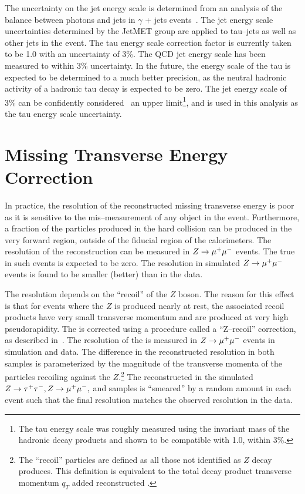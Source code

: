 The uncertainty on the jet energy scale is determined from an analysis of the
\pt balance between photons and jets in $\gamma$ + jets
events~\cite{CMS-PAS-JME-10-010}.  The jet energy scale uncertainties determined
by the JetMET group are applied to tau--jets as well as other jets in the event.
The tau energy scale correction factor is currently taken to be 1.0 with an
uncertainty of 3\%.  The QCD jet energy scale has been measured to within 3\%
uncertainty.  In the future, the energy scale of the tau is expected to be
determined to a much better precision, as the neutral hadronic activity of a
hadronic tau decay is expected to be zero. The jet energy scale of 3\% can be
confidently considered~\cite{CMS-PAS-TAU-11-001} an upper limit\footnote{The tau
energy scale was roughly measured using the invariant mass of the hadronic decay
products and shown to be compatible with 1.0, within 3\%.}, and is used in this
analysis as the tau energy scale uncertainty.

\section{Missing Transverse Energy Correction}
\label{sec:ZRecoilCorr} In practice, the resolution of the reconstructed missing
transverse energy is poor as it is sensitive to the mis--measurement of any
object in the event. Furthermore, a fraction of the particles produced in the
hard collision can be produced in the very forward region, outside of the
fiducial region of the calorimeters.  The resolution of the \MET reconstruction
can be measured in $Z\to\mu^+\mu^-$ events. The true \MET in such
events is expected to be zero.  The \MET resolution in simulated $Z\to\mu^+\mu^-$
events is found to be smaller (better) than in the data.  

The \MET resolution depends on the ``recoil'' of the $Z$ boson.  The reason for
this effect is that for events where the $Z$ is produced nearly at rest, the
associated recoil products have very small transverse momentum and are produced
at very high pseudorapidity.  The \MET is corrected using a procedure called a
``Z--recoil'' correction, as described in~\cite{CMS_AN_2010-332}.  The
resolution of the \MET is measured in $Z\to\mu^+\mu^-$ events in simulation and data.
The difference in the reconstructed \MET resolution in both samples is
parameterized by the magnitude of the transverse momenta of the particles
recoiling against the $Z$.\footnote{The ``recoil'' particles are defined as all
those not identified as $Z$ decay produces. This definition is equivalent to the
total decay product transverse momentum $q_T$ added reconstructed \MET.}  The
reconstructed \MET in the simulated $Z\to\tau^+\tau^-, Z\to\mu^+\mu^-,$ and \WpJets samples is
``smeared'' by a random amount in each event such that the final resolution
matches the observed resolution in the data.

